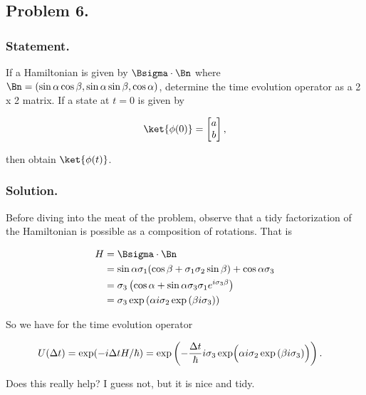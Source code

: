 \subsection{Problem 6.}
\subsubsection{Statement.}

If a Hamiltonian is given by $\Bsigma \cdot \Bn$ where $\Bn = (\sin\alpha\cos\beta, \sin\alpha\sin\beta, \cos\alpha)$, determine the time evolution operator as a 2 x 2 matrix.  If a state at $t = 0$ is given by 

\begin{align}\label{eqn:desaiCh5:600}
\ket{\phi(0)} = 
\begin{bmatrix}
a \\
b
\end{bmatrix},
\end{align}

then obtain $\ket{\phi(t)}$.

\subsubsection{Solution.}

Before diving into the meat of the problem, observe that a tidy factorization of the Hamiltonian is possible as a composition of rotations.  That is

\begin{align*}
H 
&= \Bsigma \cdot \Bn \\
&= \sin\alpha \sigma_1 ( \cos\beta + \sigma_1 \sigma_2 \sin\beta ) + \cos\alpha \sigma_3 \\
&= \sigma_3 \left(
\cos\alpha 
+ \sin\alpha \sigma_3 \sigma_1 e^{ i \sigma_3 \beta }
\right) \\
&= 
\sigma_3 \exp\left( \alpha i \sigma_2 
\exp\left( \beta i \sigma_3 
\right)
\right)
\end{align*}

So we have for the time evolution operator

\begin{align}\label{eqn:desaiCh5:610}
U(\Delta t) 
&=
\exp( -i \Delta t H /\hbar )
= 
\exp \left(
- \frac{\Delta t}{\hbar} i \sigma_3 \exp\Bigl( \alpha i \sigma_2 
\exp\left( \beta i \sigma_3 
\right)
\Bigr)
\right).
\end{align}

Does this really help?  I guess not, but it is nice and tidy.

